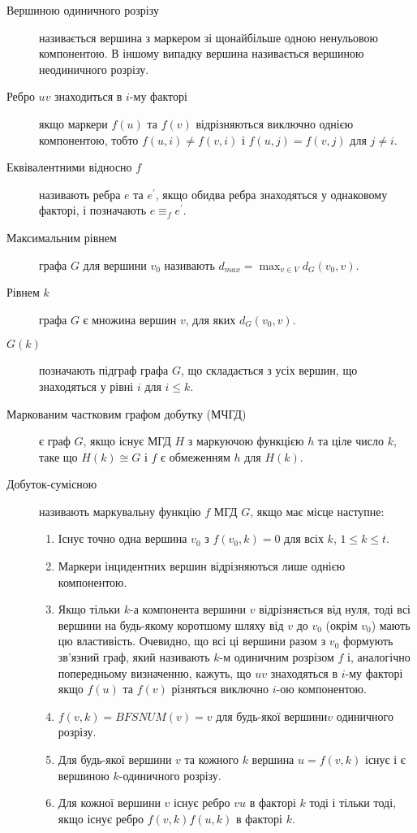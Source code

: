\begin{description}
\item[Вершиною одиничного розрізу] називається вершина з маркером зі щонайбільше одною ненульовою компонентою. В іншому випадку вершина називається вершиною неодиничного розрізу.
\item[Ребро $uv$ знаходиться в $i$-му факторі] якщо маркери $f(u)$ та $f(v)$ відрізняються виключно однією компонентою, тобто $f(u,i) \ne f(v,i)$ і $f(u,j) = f(v,j)$ для $j \ne i$.
\item[Еквівалентними відносно $f$] називають ребра $e$ та $e^\prime$, якщо обидва ребра знаходяться у однаковому факторі, і позначають $e \equiv_f e^\prime$.
\item[Максимальним рівнем] графа $G$ для вершини $v_0$ називають $d_{max}=\max_{v \in V}d_G(v_0,v)$.
\item[Рівнем $k$] графа $G$ є множина вершин $v$, для яких $d_G(v_0,v)$.
\item[$G(k)$] позначають підграф графа $G$, що складається з усіх вершин, що знаходяться у рівні $i$ для $i \le k$.
\item[Маркованим частковим графом добутку (МЧГД)] є граф $G$, якщо існує МГД $H$ з маркуючою функцією $h$ та ціле число $k$, таке що $H(k) \cong G$ і $f$ є обмеженням $h$ для $H(k)$.
\item[Добуток-сумісною] називають маркувальну функцію $f$ МГД $G$, якщо має місце наступне:
  \begin{enumerate}
    \item Існує точно одна вершина $v_0$ з $f(v_0,k)=0$ для всіх $k$, $1 \le k \le t$.
    \item Маркери інцидентних вершин відрізняються лише однією компонентою.
    \item Якщо тільки $k$-а компонента вершини $v$ відрізняється від нуля, тоді всі вершини на будь-якому коротшому шляху від $v$ до $v_0$ (окрім $v_0$) мають цю властивість.
Очевидно, що всі ці вершини разом з $v_0$ формують зв'язний граф, який називають $k$-м одиничним розрізом $f$ і, аналогічно попередньому визначенню, кажуть, що $uv$ знаходяться в $i$-му факторі якщо $f(u)$ та $f(v)$ різняться виключно $i$-ою компонентою.
    \item $f(v,k)=BFSNUM(v)=v$ для будь-якої вершини$v$ одиничного розрізу.
    \item Для будь-якої вершини $v$ та кожного $k$ вершина $u=f(v,k)$ існує і є вершиною $k$-одиничного розрізу.
    \item Для кожної вершини $v$ існує ребро $vu$ в факторі $k$ тоді і тільки тоді, якщо існує ребро $f(v,k)f(u,k)$ в факторі $k$.

\end{enumerate}
\end{description}
